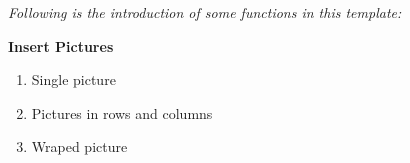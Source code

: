 \newpage
\textit{Following is the introduction of some functions in this template:} \\
\vspace{1cm}

\vspace{1cm}

\begin{problem}[1]
    \textbf{Insert Pictures}
    \begin{enumerate}[nosep,label=(\arabic*)]
    \item Single picture
        \item Pictures in rows and columns
        \item Wraped picture
    \end{enumerate}
\end{problem}


